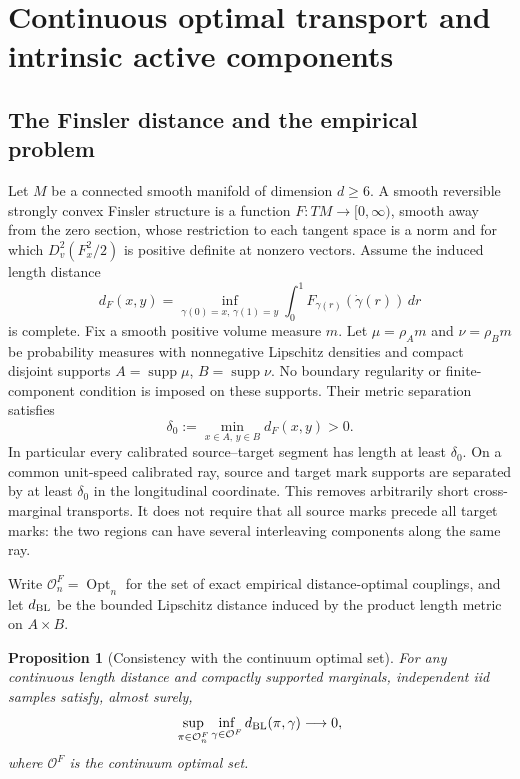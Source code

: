 \documentclass[11pt,reqno]{amsart}
\newtheorem{proposition}[theorem]{Proposition}
\theoremstyle{definition}
\theoremstyle{remark}
\numberwithin{equation}{section}
\begin{document}
\section{Continuous optimal transport and intrinsic active components}\label{sec:continuous-geometry}

\subsection{The Finsler distance and the empirical problem}

Let \(M\) be a connected smooth manifold of dimension \(d\ge6\).
A smooth reversible strongly convex Finsler structure is a function
\(F:TM\to[0,\infty)\), smooth away from the zero section, whose
restriction to each tangent space is a norm and for which
\(D_v^2(F_x^2/2)\) is positive definite at nonzero vectors. Assume
the induced length distance
\[
d_F(x,y)=\inf_{\gamma(0)=x,\,\gamma(1)=y}
\int_0^1F_{\gamma(r)}(\dot\gamma(r))\,dr
\]
is complete. Fix a smooth positive volume measure \(m\). Let
\(\mu=\rho_A m\) and \(\nu=\rho_Bm\) be probability measures
with nonnegative Lipschitz densities and compact disjoint supports
\(A=\operatorname{supp}\mu\), \(B=\operatorname{supp}\nu\).
No boundary regularity or finite-component condition is imposed on
these supports. Their metric separation satisfies
\[
\delta_0:=\min_{x\in A,\,y\in B}d_F(x,y)>0.
\]
In particular every calibrated source--target segment has length
at least \(\delta_0\). On a common unit-speed calibrated ray,
source and target mark supports are separated by at least
\(\delta_0\) in the longitudinal coordinate. This removes
arbitrarily short cross-marginal transports. It does not require
that all source marks precede all target marks: the two regions
can have several interleaving components along the same ray.

Write \(\mathcal O_n^F=\operatorname{Opt}_n\) for the set of exact empirical
distance-optimal couplings, and let \(d_{\rm BL}\) be the bounded Lipschitz
distance induced by the product length metric on \(A\times B\).

\begin{proposition}[Consistency with the continuum optimal set]
For any continuous length distance and compactly supported marginals,
independent iid samples satisfy, almost surely,
\[
\sup_{\pi\in\mathcal O_n^F}\inf_{\gamma\in\mathcal O^F}
d_{\rm BL}(\pi,\gamma)\longrightarrow0,
\]
where \(\mathcal O^F\) is the continuum optimal set.
\end{proposition}
\end{document}
